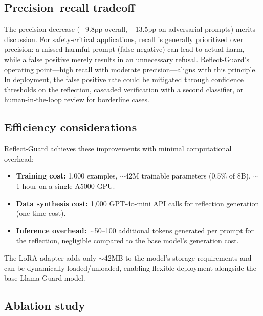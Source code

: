 \documentclass[11pt]{article}
\begin{document}
\subsection{Precision--recall tradeoff}

The precision decrease ($-$9.8pp overall, $-$13.5pp on adversarial prompts) merits discussion. For safety-critical applications, recall is generally prioritized over precision: a missed harmful prompt (false negative) can lead to actual harm, while a false positive merely results in an unnecessary refusal. Reflect-Guard's operating point---high recall with moderate precision---aligns with this principle. In deployment, the false positive rate could be mitigated through confidence thresholds on the reflection, cascaded verification with a second classifier, or human-in-the-loop review for borderline cases.

\subsection{Efficiency considerations}

Reflect-Guard achieves these improvements with minimal computational overhead:
\begin{itemize}[leftmargin=*, nosep]
  \item \textbf{Training cost:} 1{,}000 examples, $\sim$42M trainable parameters (0.5\% of 8B), $\sim$1 hour on a single A5000 GPU.
  \item \textbf{Data synthesis cost:} 1{,}000 GPT-4o-mini API calls for reflection generation (one-time cost).
  \item \textbf{Inference overhead:} $\sim$50--100 additional tokens generated per prompt for the reflection, negligible compared to the base model's generation cost.
\end{itemize}

The LoRA adapter adds only $\sim$42MB to the model's storage requirements and can be dynamically loaded/unloaded, enabling flexible deployment alongside the base Llama Guard model.

\subsection{Ablation study}
\label{sec:ablation}
\end{document}
